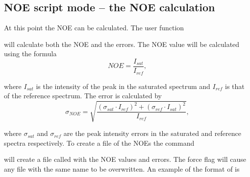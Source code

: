 
\subsection{NOE script mode -- the NOE calculation}

At this point the NOE can be calculated.  The user function


will calculate both the NOE and the errors.  The NOE value will be calculated using the formula
\begin{equation}
NOE = \frac{I_{sat}}{I_{ref}},
\end{equation}

\noindent where $I_{sat}$ is the intensity of the peak in the saturated spectrum and $I_{ref}$ is that of the reference spectrum.  The error is calculated by
\begin{equation}
\sigma_{NOE} = \sqrt{\frac{(\sigma_{sat} \cdot I_{ref})^2 + (\sigma_{ref} \cdot I_{sat})^2}{I_{ref}}},
\end{equation}

\noindent where $\sigma_{sat}$ and $\sigma_{ref}$ are the peak intensity errors in the saturated and reference spectra respectively.  To create a file of the NOEs the command


will create a file called  with the NOE values and errors.  The force flag will cause any file with the same name to be overwritten.  An example of the format of  is

